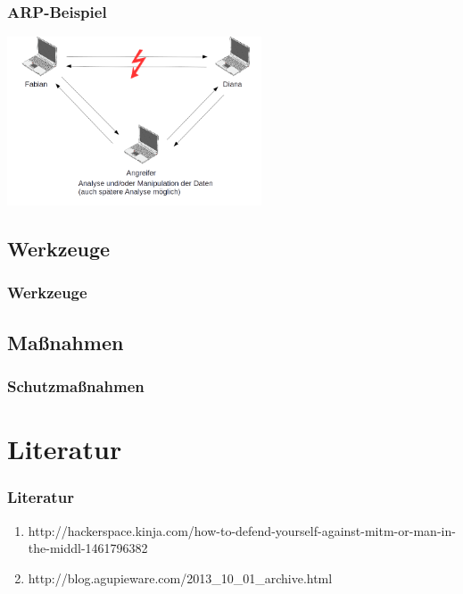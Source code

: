 \documentclass{beamer}
\begin{document}
	   	\begin{frame}
	   		\frametitle{ARP-Beispiel}
	   		\includegraphics[height=5.0cm]{ARP-Tabelle-manipuliert_1.png}
	   	\end{frame}
    	
    	\subsection*{Werkzeuge}
		\begin{frame}
        	\frametitle{Werkzeuge}
                       	
    	\end{frame}
    	\subsection*{Maßnahmen}
		\begin{frame}
        	\frametitle{Schutzmaßnahmen}
                       	
    	\end{frame}

	\section{Literatur}
    	\begin{frame}
    		\frametitle{Literatur}
    		\begin{enumerate}
    			\item http://hackerspace.kinja.com/how-to-defend-yourself-against-mitm-or-man-in-the-middl-1461796382
    			\item http://blog.agupieware.com/2013_10_01_archive.html
    		\end{enumerate}
    	\end{frame}    
\end{document}
